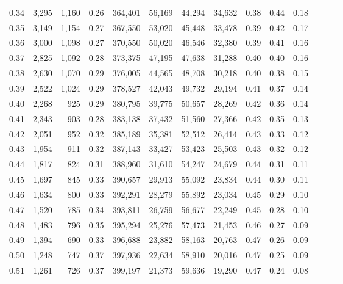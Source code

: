 \begin{tabular}{rrrrrrrrrrrrrr}
0.34 &   3,295 &  1,160 &  0.26 &  364,401 &   56,169 &  44,294 &  34,632 &  0.38 &  0.44 &      0.18 \\
0.35 &   3,149 &  1,154 &  0.27 &  367,550 &   53,020 &  45,448 &  33,478 &  0.39 &  0.42 &      0.17 \\
0.36 &   3,000 &  1,098 &  0.27 &  370,550 &   50,020 &  46,546 &  32,380 &  0.39 &  0.41 &      0.16 \\
0.37 &   2,825 &  1,092 &  0.28 &  373,375 &   47,195 &  47,638 &  31,288 &  0.40 &  0.40 &      0.16 \\
0.38 &   2,630 &  1,070 &  0.29 &  376,005 &   44,565 &  48,708 &  30,218 &  0.40 &  0.38 &      0.15 \\
0.39 &   2,522 &  1,024 &  0.29 &  378,527 &   42,043 &  49,732 &  29,194 &  0.41 &  0.37 &      0.14 \\
0.40 &   2,268 &    925 &  0.29 &  380,795 &   39,775 &  50,657 &  28,269 &  0.42 &  0.36 &      0.14 \\
0.41 &   2,343 &    903 &  0.28 &  383,138 &   37,432 &  51,560 &  27,366 &  0.42 &  0.35 &      0.13 \\
0.42 &   2,051 &    952 &  0.32 &  385,189 &   35,381 &  52,512 &  26,414 &  0.43 &  0.33 &      0.12 \\
0.43 &   1,954 &    911 &  0.32 &  387,143 &   33,427 &  53,423 &  25,503 &  0.43 &  0.32 &      0.12 \\
0.44 &   1,817 &    824 &  0.31 &  388,960 &   31,610 &  54,247 &  24,679 &  0.44 &  0.31 &      0.11 \\
0.45 &   1,697 &    845 &  0.33 &  390,657 &   29,913 &  55,092 &  23,834 &  0.44 &  0.30 &      0.11 \\
0.46 &   1,634 &    800 &  0.33 &  392,291 &   28,279 &  55,892 &  23,034 &  0.45 &  0.29 &      0.10 \\
0.47 &   1,520 &    785 &  0.34 &  393,811 &   26,759 &  56,677 &  22,249 &  0.45 &  0.28 &      0.10 \\
0.48 &   1,483 &    796 &  0.35 &  395,294 &   25,276 &  57,473 &  21,453 &  0.46 &  0.27 &      0.09 \\
0.49 &   1,394 &    690 &  0.33 &  396,688 &   23,882 &  58,163 &  20,763 &  0.47 &  0.26 &      0.09 \\
0.50 &   1,248 &    747 &  0.37 &  397,936 &   22,634 &  58,910 &  20,016 &  0.47 &  0.25 &      0.09 \\
0.51 &   1,261 &    726 &  0.37 &  399,197 &   21,373 &  59,636 &  19,290 &  0.47 &  0.24 &      0.08 \\

\end{tabular}
